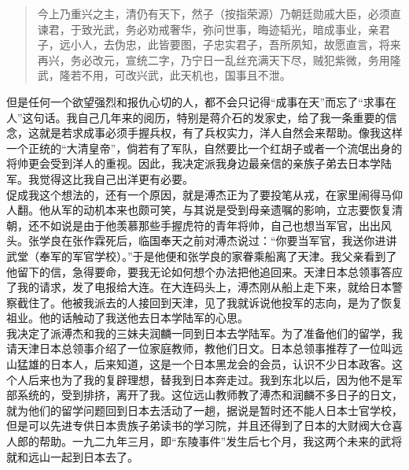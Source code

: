\begin{quote}
	今上乃重兴之主，清仍有天下，然子（按指荣源）乃朝廷勋戚大臣，必须直谏君，于致光武，务必劝戒奢华，弥问世事，晦迹韬光，暗成事业，亲君子，远小人，去伪忠，此皆要图，子忠实君子，吾所夙知，故愿直言，将来再兴，务必改元，宣统二字，乃宁日一乱丝充满天下尽，贼犯紫微，务用隆武，隆若不用，可改兴武，此天机也，国事且不泄。\\
\end{quote}

但是任何一个欲望强烈和报仇心切的人，都不会只记得“成事在天”而忘了“求事在人”这句话。我自己几年来的阅历，特别是蒋介石的发家史，给了我一条重要的信念，这就是若求成事必须手握兵权，有了兵权实力，洋人自然会来帮助。像我这样一个正统的“大清皇帝”，倘若有了军队，自然要比一个红胡子或者一个流氓出身的将帅更会受到洋人的重视。因此，我决定派我身边最亲信的亲族子弟去日本学陆军。我觉得这比我自己出洋更有必要。\\

促成我这个想法的，还有一个原因，就是溥杰正为了要投笔从戎，在家里闹得马仰人翻。他从军的动机本来也颇可笑，与其说是受到母亲遗嘱的影响，立志要恢复清朝，还不如说是由于他羡慕那些手握虎符的青年将帅，自己也想当军官，出出风头。张学良在张作霖死后，临国奉天之前对溥杰说过：“你要当军官，我送你进讲武堂（奉军的军官学校）。”于是他便和张学良的家眷乘船离了天津。我父亲看到了他留下的信，急得要命，要我无论如何想个办法把他追回来。天津日本总领事答应了我的请求，发了电报给大连。在大连码头上，溥杰刚从船上走下来，就给日本警察截住了。他被我派去的人接回到天津，见了我就诉说他投军的志向，是为了恢复祖业。他的话触动了我送他去日本学陆军的心思。\\

我决定了派溥杰和我的三妹夫润麟一同到日本去学陆军。为了准备他们的留学，我请天津日本总领事介绍了一位家庭教师，教他们日文。日本总领事推荐了一位叫远山猛雄的日本人，后来知道，这是一个日本黑龙会的会员，认识不少日本政客。这个人后来也为了我的复辟理想，替我到日本奔走过。我到东北以后，因为他不是军部系统的，受到排挤，离开了我。这位远山教师教了溥杰和润麟不多日子的日文，就为他们的留学问题回到日本去活动了一趟，据说是暂时还不能人日本士官学校，但是可以先进专供日本贵族子弟读书的学习院，并且还得到了日本的大财阀大仓喜人郎的帮助。一九二九年三月，即“东陵事件”发生后七个月，我这两个未来的武将就和远山一起到日本去了。\\